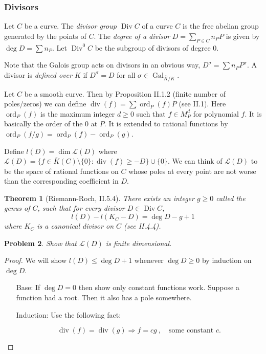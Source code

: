 \documentclass[11pt]{article}
\newcommand{\st}{\colon}
\newcommand{\Div}{\operatorname{Div}}
\renewcommand{\div}{\operatorname{div}} %
\newcommand{\gal}{\operatorname{Gal}}
\newcommand{\ord}{\operatorname{ord}}
\theoremstyle{plain}%
\newtheorem{thm}{Theorem}[section]
\newtheorem{prob}[thm]{Problem}
\theoremstyle{definition}
\theoremstyle{remark}
\begin{document}
\subsubsection{Divisors}

Let $C$ be a curve. The \emph{divisor group $\Div C$} of a curve $C$ is the free abelian group generated by the points of $C$. The \emph{degree of a divisor} $D = \sum_{P\in C} n_P P$ is given by $\deg D = \sum n_P$. Let $\Div^0 C$ be the subgroup of divisors of degree $0$.

Note that the Galois group acts on divisors in an obvious way, $D^\sigma = \sum n_P P^\sigma$. A divisor is \emph{defined over $K$} if $D^\sigma = D$ for all $\sigma\in\gal_{\overline{K}/K}$.

Let $C$ be a smooth curve. Then by Proposition II.1.2 (finite number of poles/zeros) we can define $\div(f) = \sum \ord_P(f) P$ (see II.1). Here $\ord_P(f)$ is the maximum integer $d\geq 0$ such that $f\in M^d_P$ for polynomial $f$. It is basically the order of the $0$ at $P$. It is extended to rational functions by $\ord_P(f/g) = \ord_P(f) - \ord_P(g)$.

Define $l(D) = \dim \mathscr{L}(D)$ where $\mathscr{L}(D) = \{f\in\overline{K}(C)\setminus\{0\} \st \div(f) \geq -D \}\cup\{0\}$. We can think of $\mathscr{L}(D)$ to be the space of rational functions on $C$ whose poles at every point are not worse than the corresponding coefficient in $D$.

\begin{thm}[Riemann-Roch, II.5.4]
	There exists an integer $g\geq 0$ called the genus of $C$, such that for every divisor $D\in\Div C$,
	$$
	l(D) - l(K_C - D) = \deg D - g + 1
	$$
	where $K_C$ is a canonical divisor on $C$ (see II.4.4).
\end{thm}

\begin{prob}
	Show that $\mathscr{L}(D)$ is finite dimensional.
\end{prob}
\begin{proof}
	We will show $l(D)\leq \deg D + 1$ whenever $\deg D \geq 0$ by induction on $\deg D$.

	\begin{enumerate}
		\item[Base:] If $\deg D = 0$ then show only constant functions work. Suppose a function had a root. Then it also has a pole somewhere.

		\item[Induction:] Use the following fact:

		$$
		\div(f) = \div(g) \Rightarrow f=cg \ ,\quad \text{some constant $c$}.
		$$
	\end{enumerate}
\end{proof}
\end{document}
